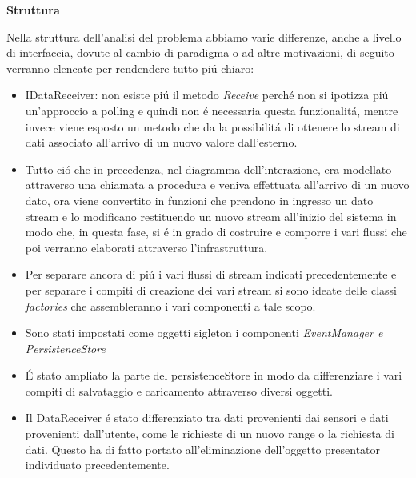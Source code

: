 \newpage

\begin{center}
\textbf{Struttura}
\end{center}

Nella struttura dell'analisi del problema abbiamo varie differenze, anche a livello di interfaccia, dovute al cambio di paradigma o ad altre motivazioni, di seguito verranno elencate per rendendere tutto pi\'u chiaro:

\begin{itemize}
\item IDataReceiver: non esiste pi\'u il metodo \textit{Receive} perch\'e non si ipotizza pi\'u un'approccio a polling e quindi non \'e necessaria questa funzionalit\'a, mentre invece viene esposto un metodo che da la possibilit\'a di ottenere lo stream di dati associato all'arrivo di un nuovo valore dall'esterno.
\item Tutto ci\'o che in precedenza, nel diagramma dell'interazione, era modellato attraverso una chiamata a procedura e veniva effettuata all'arrivo di un nuovo dato, ora viene convertito in funzioni che prendono in ingresso un dato stream e lo modificano restituendo un nuovo stream all'inizio del sistema in modo che, in questa fase, si \'e in grado di costruire e comporre i vari flussi che poi verranno elaborati attraverso l'infrastruttura.
\item Per separare ancora di pi\'u i vari flussi di stream indicati precedentemente e per separare i compiti di creazione dei vari stream si sono ideate delle classi \textit{factories} che assembleranno i vari componenti a tale scopo.
\item Sono stati impostati come oggetti sigleton i componenti \textit{EventManager e PersistenceStore}
\item \'E stato ampliato la parte del persistenceStore in modo da differenziare i vari compiti di salvataggio e caricamento attraverso diversi oggetti.
\item Il DataReceiver \'e stato differenziato tra dati provenienti dai sensori e dati provenienti dall'utente, come le richieste di un nuovo range o la richiesta di dati. Questo ha di fatto portato all'eliminazione dell'oggetto presentator individuato precedentemente.
\end{itemize}

